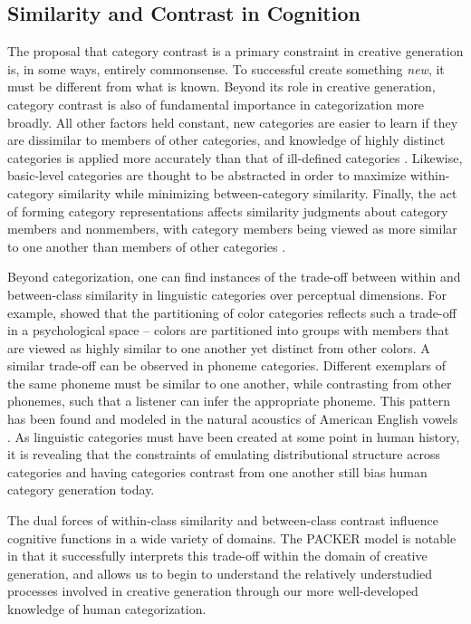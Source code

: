 \documentclass[12pt]{article}
\begin{document}
\begin{flushleft}
\subsection{Similarity and Contrast in Cognition}

The proposal that category contrast is a primary constraint in creative generation is, in some ways, entirely commonsense. To successful create something \textit{new}, it must be different from what is known. Beyond its role in creative generation, category contrast is also of fundamental importance in categorization more broadly. All other factors held constant, new categories are easier to learn if they are dissimilar to members of other categories, and knowledge of highly distinct categories is applied more accurately than that of ill-defined categories \citep{ashby1994categorization,imai1965discriminability}. Likewise, basic-level categories \citep{rosch1976basic} are thought to be abstracted in order to maximize within-category similarity while minimizing between-category similarity. Finally, the act of forming category representations affects similarity judgments about category members and nonmembers, with category members being viewed as more similar to one another than members of other categories \citep{goldstone1994influences,goldstone2001altering}.

Beyond categorization, one can find instances of the trade-off between within and between-class similarity in linguistic categories over perceptual dimensions. For example, \cite{regier2007} showed that the partitioning of color categories reflects such a trade-off in a psychological space -- colors are partitioned into groups with members that are viewed as highly similar to one another yet distinct from other colors. A similar trade-off can be observed in phoneme categories. Different exemplars of the same phoneme must be similar to one another, while contrasting from other phonemes, such that a listener can infer the appropriate phoneme. This pattern has been found and modeled in the natural acoustics of American English vowels \citep{feldman2013,hillenbrand1995}. As linguistic categories must have been created at some point in human history, it is revealing that the constraints of emulating distributional structure across categories and having categories contrast from one another still bias human category generation today.

The dual forces of within-class similarity and between-class contrast influence cognitive functions in a wide variety of domains. The PACKER model is notable in that it successfully interprets this trade-off within the domain of creative generation, and allows us to begin to understand the relatively understudied processes involved in creative generation through our more well-developed knowledge of human categorization.



\end{flushleft}
\end{document}

